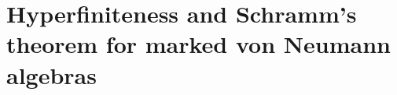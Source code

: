\documentclass[11pt]{amsart}
\DeclareMathOperator{\Sp}{Sp}
\theoremstyle{definition}
\theoremstyle{remark}
\theoremstyle{definition}
\begin{document}



\section{Hyperfiniteness and Schramm's theorem for marked von Neumann algebras}\label{sec:hyperfinite}
\end{document}
